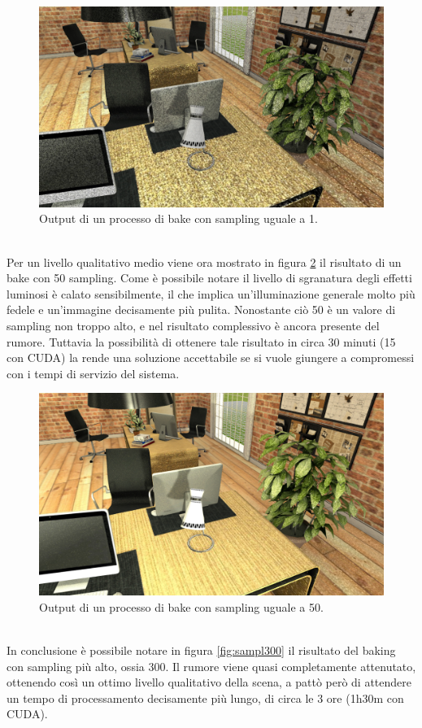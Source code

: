 \begin{figure}[htb]
 \centering
 \includegraphics[width=0.7\linewidth]{images/chapter_prove_sperimentali/sampl1.png}\hfill
 \caption[Output sampling 1]{Output di un processo di bake con sampling uguale a 1.}
 \label{fig:sampl1}
\end{figure}
\\
Per un livello qualitativo medio viene ora mostrato in figura \ref{fig:sampl50} il risultato di un bake con 50 sampling.
Come è possibile notare il livello di sgranatura degli effetti luminosi è calato sensibilmente, il che implica un’illuminazione generale molto più fedele e un’immagine decisamente più pulita.
Nonostante ciò 50 è un valore di sampling non troppo alto, e nel risultato complessivo è ancora presente del rumore. Tuttavia la possibilità di ottenere tale risultato in circa 30 minuti (15 con CUDA) la rende una soluzione accettabile se si vuole giungere a compromessi con i tempi di servizio del sistema.
\\
\begin{figure}[htb]
 \centering
 \includegraphics[width=0.7\linewidth]{images/chapter_prove_sperimentali/sampl50.png}\hfill
 \caption[Output sampling 50]{Output di un processo di bake con sampling uguale a 50.}
 \label{fig:sampl50}
\end{figure}
\\
In conclusione è possibile notare in figura \ref{fig:sampl300} il risultato del baking con sampling più alto, ossia 300. Il rumore viene quasi completamente attenutato, ottenendo così un ottimo livello qualitativo della scena, a pattò però di attendere un tempo di processamento decisamente più lungo, di circa le 3 ore (1h30m con CUDA).

